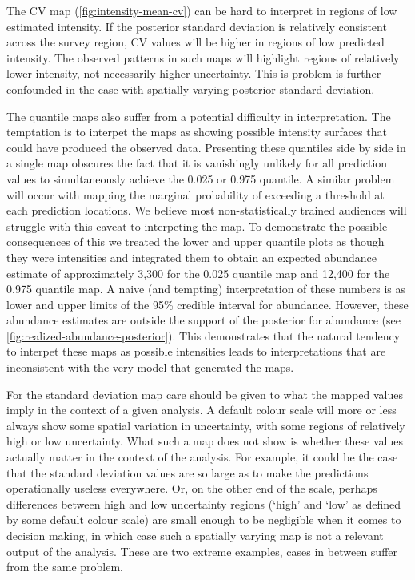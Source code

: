 \documentclass[preprint,12pt]{elsarticle}
\begin{document}
The CV map (\autoref{fig:intensity-mean-cv}) can be hard to interpret in regions of low estimated intensity.  If the posterior standard deviation is relatively consistent across the survey region, CV values will be higher in regions of low predicted intensity.  The observed patterns in such maps will highlight regions of relatively lower intensity, not necessarily higher uncertainty.  This is problem is further confounded in the case with spatially varying posterior standard deviation.

The quantile maps also suffer from a potential difficulty in interpretation. The temptation is to interpet the maps as showing possible intensity surfaces that could have produced the observed data.  Presenting these quantiles side by side in a single map obscures the fact that it is vanishingly unlikely for all prediction values to simultaneously achieve the 0.025 or 0.975 quantile.  A similar problem will occur with mapping the marginal probability of exceeding a threshold at each prediction locations.  We believe most non-statistically trained audiences will struggle with this caveat to interpeting the map.  To demonstrate the possible consequences of this we treated the lower and upper quantile plots as though they were intensities and integrated them to obtain an expected abundance estimate of approximately 3,300 for the 0.025 quantile map and 12,400 for the 0.975 quantile map.  A naive (and tempting) interpretation of these numbers is as lower and upper limits of the 95\% credible interval for abundance. However, these abundance estimates are outside the support of the posterior for abundance (see \autoref{fig:realized-abundance-posterior}).  This demonstrates that the natural tendency to interpet these maps as possible intensities leads to interpretations that are inconsistent with the very model that generated the maps.

For the standard deviation map care should be given to what the mapped values imply in the context of a given analysis.  A default colour scale will more or less always show some spatial variation in uncertainty, with some regions of relatively high or low uncertainty.  What such a map does not show is whether these values actually matter in the context of the analysis.  For example, it could be the case that the standard deviation values are so large as to make the predictions operationally useless everywhere.  Or, on the other end of the scale, perhaps differences between high and low uncertainty regions (`high' and `low' as defined by some default colour scale) are small enough to be negligible when it comes to decision making, in which case such a spatially varying map is not a relevant output of the analysis.  These are two extreme examples, cases in between suffer from the same problem.  
\end{document}
